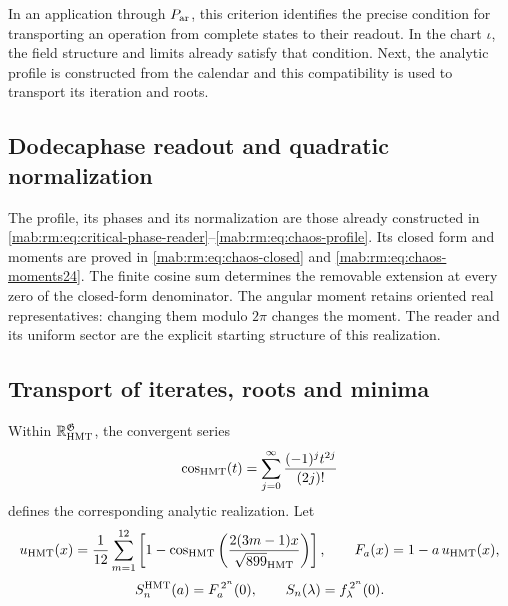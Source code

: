 In an application through \(P_{\rm ar}\), this criterion identifies the precise condition for transporting an operation from complete states to their readout. In the chart \(\iota\), the field structure and limits already satisfy that condition. Next, the analytic profile is constructed from the calendar and this compatibility is used to transport its iteration and roots.

\subsection{Dodecaphase readout and quadratic normalization}
\label{hmtfg:perfil-dodecafasico}

The profile, its phases and its normalization are those already constructed in \eqref{mab:rm:eq:critical-phase-reader}--\eqref{mab:rm:eq:chaos-profile}. Its closed form and moments are proved in \eqref{mab:rm:eq:chaos-closed} and \eqref{mab:rm:eq:chaos-moments24}. The finite cosine sum determines the removable extension at every zero of the closed-form denominator. The angular moment retains oriented real representatives: changing them modulo $2\pi$ changes the moment. The reader and its uniform sector are the explicit starting structure of this realization.

\subsection{Transport of iterates, roots and minima}
\label{hmtfg:transporte-raices}

Within \(\mathbb R_{\rm HMT}^{\mathfrak G}\), the convergent series
\[
 \cos_{\rm HMT}(t)=\sum_{j=0}^{\infty}
                   \frac{(-1)^j t^{2j}}{(2j)!}
\]
defines the corresponding analytic realization. Let
\[
 u_{\rm HMT}(x)=\frac1{12}\sum_{m=1}^{12}
  \left[1-\cos_{\rm HMT}
   \left(\frac{2(3m-1)x}{\sqrt{899}_{\rm HMT}}\right)\right],
 \qquad F_a(x)=1-a\,u_{\rm HMT}(x),
\]
\[
 S_n^{\rm HMT}(a)=F_a^{\,2^n}(0),\qquad
 S_n(\lambda)=f_\lambda^{\,2^n}(0).
\]


